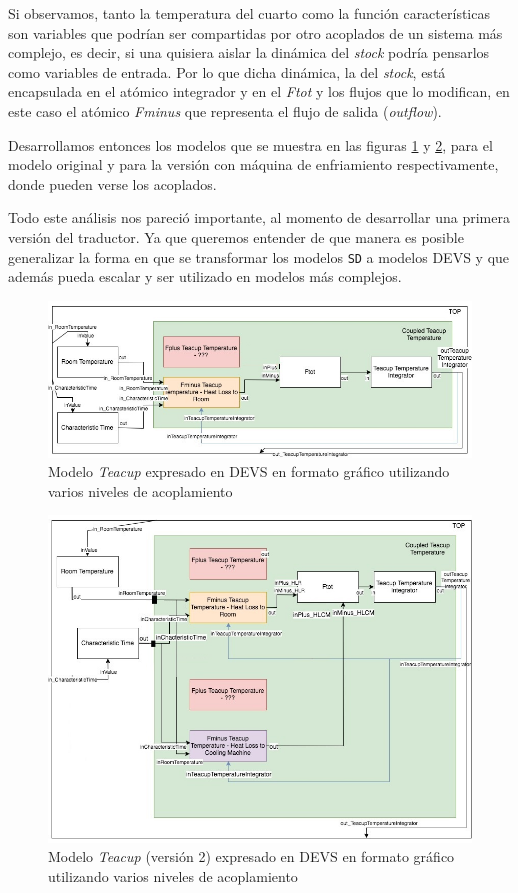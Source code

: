Si observamos, tanto la temperatura del cuarto como la función características son variables que podrían ser compartidas por otro acoplados de un sistema más complejo, es decir, si una quisiera aislar la dinámica del \textit{stock} podría pensarlos como variables de entrada. Por lo que dicha dinámica, la del \textit{stock}, está encapsulada en el atómico integrador y en el \textit{Ftot} y los flujos que lo modifican, en este caso el atómico \textit{Fminus} que representa el flujo de salida (\textit{outflow}).

Desarrollamos entonces los modelos que se muestra en las figuras \ref{fig:Teacup_devs} y \ref{fig:Teacup_devs_2}, para el modelo original y para la versión con máquina de enfriamiento respectivamente, donde pueden verse los acoplados. 

Todo este análisis nos pareció importante, al momento de desarrollar una primera versión del traductor. Ya que queremos entender de que manera es posible generalizar la forma en que se transformar los modelos \texttt{SD} a modelos DEVS y que además pueda escalar y ser utilizado en modelos más complejos. 

\begin{figure}[!h]
	\centering
	\includegraphics[scale=0.35]{imagenes/Teacup_devs}
	\caption{Modelo \textit{Teacup} expresado en DEVS en formato gráfico utilizando varios niveles de acoplamiento}
	\label{fig:Teacup_devs}
\end{figure}
\begin{figure}[!h]
	\centering
	\includegraphics[scale=0.35]{imagenes/Teacup_devs_2}
	\caption{Modelo \textit{Teacup} (versión 2) expresado en DEVS en formato gráfico utilizando varios niveles de acoplamiento}
	\label{fig:Teacup_devs_2}
\end{figure}
